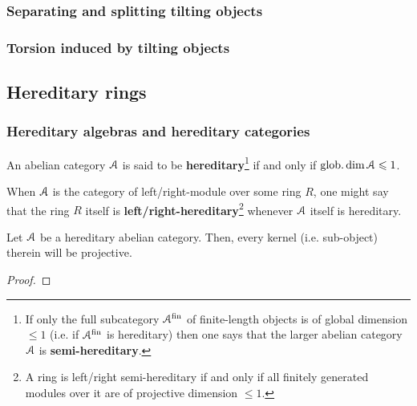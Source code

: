         \subsubsection{Separating and splitting tilting objects}
        
        \subsubsection{Torsion induced by tilting objects}
        
    \subsection{Hereditary rings}    
        \subsubsection{Hereditary algebras and hereditary categories}
            \begin{definition} \label{def: hereditary_abelian_categories}
                An abelian category $\mathcal{A}$ is said to be \textbf{hereditary}\footnote{If only the full subcategory $\mathcal{A}^{\mathrm{fin}}$ of finite-length objects is of global dimension $\leq 1$ (i.e. if $\mathcal{A}^{\mathrm{fin}}$ is hereditary) then one says that the larger abelian category $\mathcal{A}$ is \textbf{semi-hereditary}.} if and only if $\operatorname{glob.dim} \mathcal{A} \leqslant 1$.
            \end{definition}
            \begin{convention} \label{conv: left/right_hereditary_rings}
                When $\mathcal{A}$ is the category of left/right-module over some ring $R$, one might say that the ring $R$ itself is \textbf{left/right-hereditary}\footnote{A ring is left/right semi-hereditary if and only if all finitely generated modules over it are of projective dimension $\leq 1$.} whenever $\mathcal{A}$ itself is hereditary.
            \end{convention}
            \begin{proposition} \label{prop: kernels_in_hereditary_abelian_categories_are_projective}
                Let $\mathcal{A}$ be a hereditary abelian category. Then, every kernel (i.e. sub-object) therein will be projective.
            \end{proposition}
                \begin{proof}
                    
                \end{proof}
